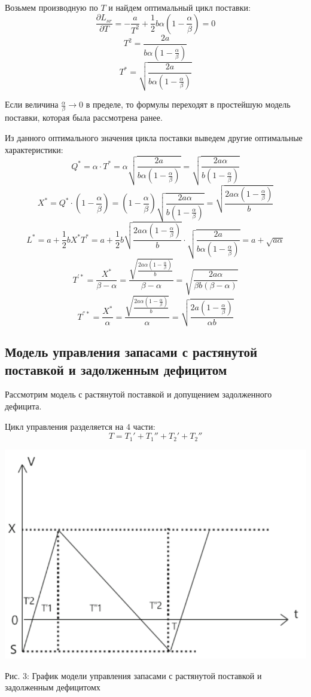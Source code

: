 \documentclass[aps,%
12pt,%
final,%
oneside,
onecolumn,%
musixtex, %
superscriptaddress,%
centertags]{article} %
\theoremstyle{plain}
\theoremstyle{definition}
\theoremstyle{remark}
\begin{document}
Возьмем производную по $T$ и найдем оптимальный цикл поставки:
$$\frac{\partial L_{sr}}{\partial T} = - \frac{a}{T^2} + \frac{1}{2}b\alpha\left(1 - \frac{\alpha}{\beta} \right) = 0$$
$$T^2 = \frac{2a}{b\alpha\left(1-\frac{\alpha}{\beta}\right)}$$
$$T^* = \sqrt{ \frac{2a}{b\alpha\left(1-\frac{\alpha}{\beta}\right)}}$$

Если величина $\frac{\alpha}{\beta} \to 0$ в пределе, то формулы переходят в простейшую модель поставки, которая была рассмотрена ранее.

Из данного оптимального значения цикла поставки выведем другие оптимальные характеристики:
$$Q^* = \alpha \cdot T^* = \alpha \sqrt{ \frac{2a}{b\alpha\left(1-\frac{\alpha}{\beta}\right)}} = \sqrt{ \frac{2a\alpha}{b\left(1-\frac{\alpha}{\beta}\right)}}$$
$$X^* = Q^* \cdot \left({1-\frac{\alpha}{\beta}}\right) = \left({1-\frac{\alpha}{\beta}}\right) \sqrt{ \frac{2a\alpha}{b\left(1-\frac{\alpha}{\beta}\right)}}  =\sqrt{ \frac{2a\alpha\left(1-\frac{\alpha}{\beta}\right)}{b}} $$
$$L^* = a+\frac{1}{2}bX^*T^* = a +\frac{1}{2}b \sqrt{ \frac{2a\alpha\left(1-\frac{\alpha}{\beta}\right)}{b}} \cdot  \sqrt{ \frac{2a}{b\alpha\left(1-\frac{\alpha}{\beta}\right)}} = a + \sqrt{a \alpha}$$ 
$$T^{'*} = \frac{X^*}{\beta-\alpha} = \frac{\sqrt{ \frac{2a\alpha\left(1-\frac{\alpha}{\beta}\right)}{b}} }{\beta-\alpha} = \sqrt{\frac{2a\alpha}{\beta b (\beta-\alpha)}}$$
$$T^{''*} = \frac{X^*}{\alpha} = \frac{\sqrt{ \frac{2a\alpha\left(1-\frac{\alpha}{\beta}\right)}{b}} }{\alpha} = \sqrt{ \frac{2a\left(1-\frac{\alpha}{\beta}\right)}{\alpha b}} $$

\newpage
\subsection{Модель управления запасами с растянутой поставкой и задолженным дефицитом}

Рассмотрим модель с растянутой поставкой и допущением задолженного дефицита. 

Цикл управления разделяется на $4$ части:
$$T = T_1' + T_1'' + T_2' + T_2''$$

\begin{center}
  \includegraphics[scale=0.4]{images/3a.png}

  Рис. 3: График модели управления запасами с растянутой поставкой и задолженным дефицитомх
\end{center}
\end{document}
